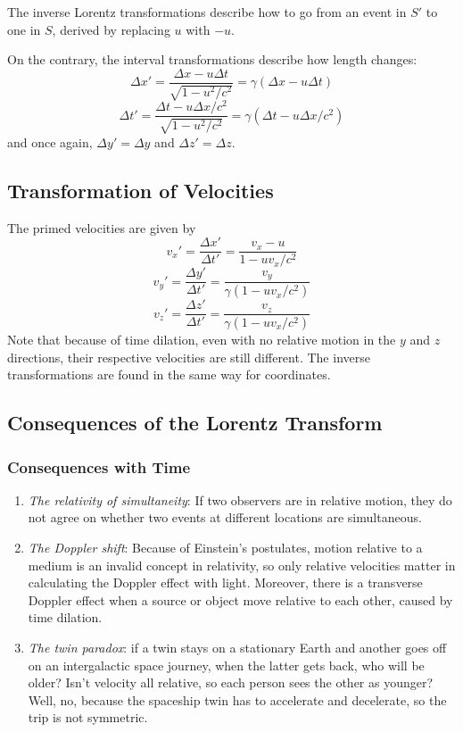 \documentclass[../PhysicsFormulae.tex]{subfiles}
\begin{document}
The inverse Lorentz transformations describe how to go from an event in $S'$ to one in $S$, derived by replacing $u$ with $-u$. \bigskip

On the contrary, the interval transformations describe how length changes: 
\[ \Delta x' = \frac{\Delta x - u\Delta t}{\sqrt{1-u^2/c^2}} = \gamma (\Delta x - u\Delta t) \]
\[ \Delta t' = \frac{\Delta t - u\Delta x/c^2}{\sqrt{1 - u^2/c^2}} = \gamma (\Delta t - u\Delta x/c^2) \]
and once again, $\Delta y' = \Delta y$ and $\Delta z' = \Delta z$. 

\subsection{Transformation of Velocities}
The primed velocities are given by
\[ v_x' = \frac{\Delta x'}{\Delta t'} = \frac{v_x-u}{1-uv_x/c^2} \]
\[ v_y' = \frac{\Delta y'}{\Delta t'} = \frac{v_y}{\gamma(1-uv_x/c^2)} \]
\[ v_z' = \frac{\Delta z'}{\Delta t'} = \frac{v_z}{\gamma(1-uv_x/c^2)} \]
Note that because of time dilation, even with no relative motion in the $y$ and $z$ directions, their respective velocities are still different. The inverse transformations are found in the same way for coordinates. 

\subsection{Consequences of the Lorentz Transform}
\subsubsection{Consequences with Time}
\begin{enumerate}
\item \textit{The relativity of simultaneity}: If two observers are in relative motion, they do not agree on whether two events at different locations are simultaneous. 
\item \textit{The Doppler shift}: Because of Einstein's postulates, motion relative to a medium is an invalid concept in relativity, so only relative velocities matter in calculating the Doppler effect with light. Moreover, there is a transverse Doppler effect when a source or object move relative to each other, caused by time dilation. 
\item \textit{The twin paradox}: if a twin stays on a stationary Earth and another goes off on an intergalactic space journey, when the latter gets back, who will be older? Isn't velocity all relative, so each person sees the other as younger? Well, no, because the spaceship twin has to accelerate and decelerate, so the trip is not symmetric. 
\end{enumerate}
\end{document}
